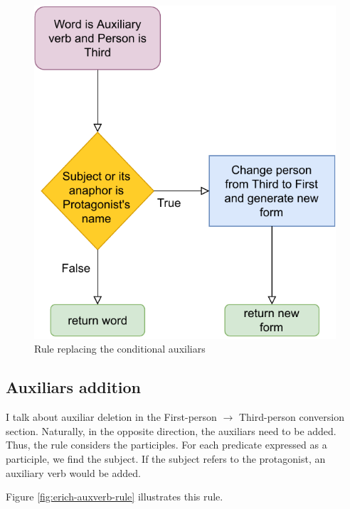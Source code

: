 \begin{figure}[!htbp]
\includegraphics[]{data/Erich-Conditional-Rule.pdf}
\caption{Rule replacing the conditional auxiliars}
\label{fig:erich-conditional-rule}
\end{figure}

\subsection{Auxiliars addition}

I talk about auxiliar deletion in the First-person $\rightarrow$ Third-person conversion section. Naturally, in the opposite direction, the auxiliars need to be added. Thus, the rule considers the participles. For each predicate expressed as a participle, we find the subject. If the subject refers to the protagonist, an auxiliary verb would be added.

Figure \ref{fig:erich-auxverb-rule} illustrates this rule.


